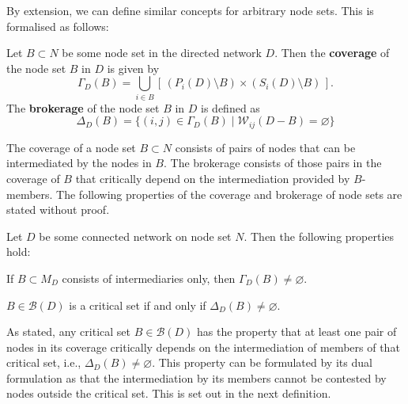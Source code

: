 By extension, we can define similar concepts for arbitrary node sets. This is formalised as follows:
\begin{definition}
Let $B \subset N$ be some node set in the directed network $D$. Then the \textbf{coverage} of the node set $B$ in $D$ is given by
\begin{equation}
\Gamma_D (B) =\bigcup_{i \in B} \left[ \, ( P_{i} \left( D \right) \setminus B ) \times \left( S_{i} \left( D \right) \setminus B \right) \, \right].
\end{equation}
The \textbf{brokerage} of the node set $B$ in $D$ is defined as
\begin{equation}
\Delta_D (B) = \{ (i,j) \in \Gamma_D (B) \mid \mathcal{W}_{ij} (D-B) = \varnothing \}
\end{equation}
\end{definition}
The coverage of a node set $B \subset N$ consists of pairs of nodes that can be intermediated by the nodes in $B$. The brokerage consists of those pairs in the coverage of $B$ that critically depend on the intermediation provided by $B$-members. The following properties of the coverage and brokerage of node sets are stated without proof.
\begin{property}
Let $D$ be some connected network on node set $N$. Then the following properties hold:
\begin{numm}
\item If $B \subset M_D$ consists of intermediaries only, then $\Gamma_D (B) \neq \varnothing$.

\item $B \in \mathcal{B} (D)$ is a critical set if and only if $\Delta_D (B) \neq \varnothing$.
\end{numm}
\end{property}
As stated, any critical set $B \in \mathcal{B} (D)$ has the property that at least one pair of nodes in its coverage critically depends on the intermediation of members of that critical set, i.e., $\Delta_D (B) \neq \varnothing$. This property can be formulated by its dual formulation as that the intermediation by its members cannot be contested by nodes outside the critical set. This is set out in the next definition.
